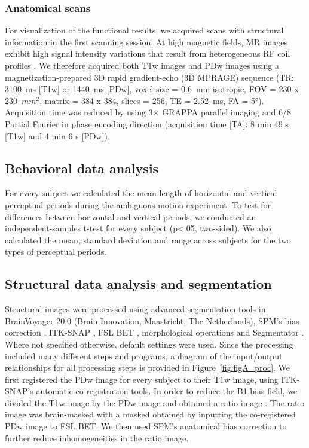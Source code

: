 \subsubsection{Anatomical scans}
For visualization of the functional results, we acquired scans with structural information in the first scanning session. At high magnetic fields, MR images exhibit high signal intensity variations that result from heterogeneous RF coil profiles \parencite{Moortele2009}. We therefore acquired both T1w images and PDw images using a magnetization-prepared 3D rapid gradient-echo (3D MPRAGE) sequence (TR: 3100~ms [T1w] or 1440~ms [PDw], voxel size = 0.6~mm isotropic, FOV = 230 x 230~$mm^2$, matrix = 384 x 384, slices = 256, TE = 2.52~ms, FA = 5°). Acquisition time was reduced by using 3× GRAPPA parallel imaging and 6/8 Partial Fourier in phase encoding direction (acquisition time [TA]: 8 min 49 s [T1w] and 4 min 6 s [PDw]).

\subsection{Behavioral data analysis}
For every subject we calculated the mean length of horizontal and vertical perceptual periods during the ambiguous motion experiment. To test for differences between horizontal and vertical periods, we conducted an independent-samples t-test for every subject (p\textless.05, two-sided). We also calculated the mean, standard deviation and range across subjects for the two types of perceptual periods.

\subsection{Structural data analysis and segmentation}
Structural images were processed using advanced segmentation tools in BrainVoyager 20.0 (Brain Innovation, Maastricht, The Netherlands), SPM's bias correction \parencite{Ashburner2005}, ITK-SNAP \parencite{py06nimg}, FSL BET \parencite{Smith2002}, morphological operations \parencite{scipy2001} and Segmentator \parencite{Gulban2018a}. Where not specified otherwise, default settings were used. Since the processing included many different steps and programs, a diagram of the input/output relationships for all processing steps is provided in Figure~\ref{fig:figA_proc}. We first registered the PDw image for every subject to their T1w image, using ITK-SNAP's automatic co-registration tools. In order to reduce the B1 bias field, we divided the T1w image by the PDw image and obtained a ratio image \parencite{Moortele2009}. The ratio image was brain-masked with a masked obtained by inputting the co-registered PDw image to FSL BET. We then used SPM's anatomical bias correction to further reduce inhomogeneities in the ratio image.

